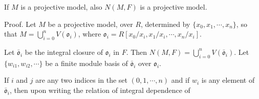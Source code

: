 If $M$ is a projective model, also $N(M, F)$ is a projective model.

Proof. Let $M$ be a projective model, over $R$, determined by $\{x_0, x_1, \cdots, x_n\}$, so that $M = \bigcup_{i=0}^{n} V(\mathfrak{o}_i)$, where $\mathfrak{o}_i = R[x_0/x_i, x_1/x_i, \cdots, x_n/x_i]$.

Let $\bar{\mathfrak{o}}_i$ be the integral closure of $\mathfrak{o}_i$ in $F$. Then $N(M, F) = \bigcup_{i=0}^{n} V(\bar{\mathfrak{o}}_i)$. Let $\{w_{i1}, w_{i2}, \cdots\}$ be a finite module basis of $\bar{\mathfrak{o}}_i$ over $\mathfrak{o}_i$.

If $i$ and $j$ are any two indices in the set $(0, 1, \cdots, n)$ and if $w_i$ is any element of $\bar{\mathfrak{o}}_i$, then upon writing the relation of integral dependence of